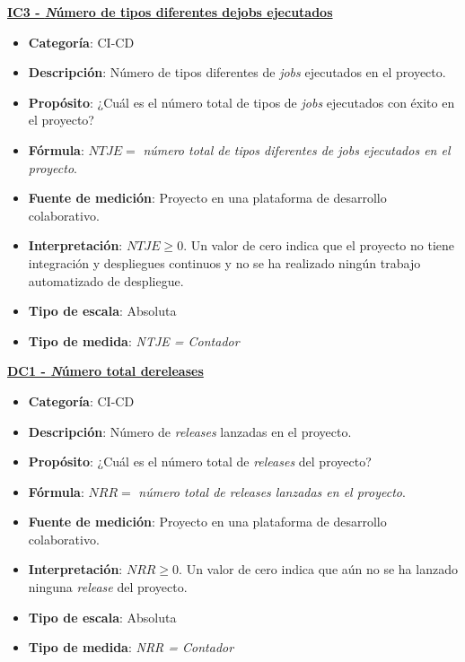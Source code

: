 \textbf{\underline{IC3 - \textit Número de tipos diferentes de{jobs} ejecutados}}
\begin{itemize}
	\item \textbf{Categoría}: CI-CD
	\item \textbf{Descripción}: Número de tipos diferentes de \textit{jobs} ejecutados en el proyecto.
	\item \textbf{Propósito}: ¿Cuál es el número total de tipos de \textit{jobs} ejecutados con éxito en el proyecto?
	\item \textbf{Fórmula}: $NTJE =$ \textit{número total de tipos diferentes de jobs ejecutados en el proyecto}.
	\item \textbf{Fuente de medición}: Proyecto en una plataforma de desarrollo colaborativo.
	\item \textbf{Interpretación}: $NTJE \geq 0$. Un valor de cero indica que el proyecto no tiene integración y despliegues continuos y no se ha realizado ningún trabajo automatizado de despliegue.
	\item \textbf{Tipo de escala}: Absoluta
	\item \textbf{Tipo de medida}: \textit{NTJE = Contador}
\end{itemize}


\textbf{\underline{DC1 - \textit Número total de{releases}}}
\begin{itemize}
	\item \textbf{Categoría}: CI-CD
	\item \textbf{Descripción}: Número de \textit{releases} lanzadas en el proyecto.
	\item \textbf{Propósito}: ¿Cuál es el número total de \textit{releases} del  proyecto?
	\item \textbf{Fórmula}: $NRR =$ \textit{número total de releases lanzadas en el proyecto}.
	\item \textbf{Fuente de medición}: Proyecto en una plataforma de desarrollo colaborativo.
	\item \textbf{Interpretación}: $NRR \geq 0$. Un valor de cero indica que aún no se ha lanzado ninguna \textit{release} del proyecto.
	\item \textbf{Tipo de escala}: Absoluta
	\item \textbf{Tipo de medida}: \textit{NRR = Contador}
\end{itemize}

